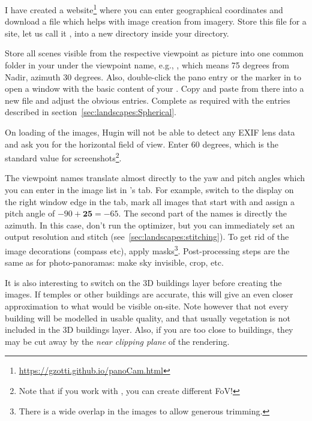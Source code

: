 I have created a
website\footnote{\url{https://gzotti.github.io/panoCam.html}} where
you can enter geographical coordinates and download a file
  which helps with image creation from 
imagery. Store this file for a site, let us call it
, into a new directory  inside
your  directory.

Store all scenes visible from the respective viewpoint
 as picture into one common folder in your
 under the viewpoint name, e.g.,
, which means 75 degrees from Nadir, azimuth 30
degrees.  Also, double-click the pano entry or the marker in  to open a window with the
basic content of your . Copy and paste from there
into a new file  and adjust the obvious
entries. Complete as required with the entries described in
section~\ref{sec:landscapes:Spherical}.

On loading of the images, Hugin will not be able to detect any EXIF
lens data and ask you for the horizontal field of view. Enter 60
degrees, which is the standard value for 
screenshots\footnote{Note that if you work with , you
  can create different FoV!}.

The viewpoint names translate almost directly to the yaw and pitch
angles which you can enter in the image list in 's
 tab. For example, switch to the  display
on the right window edge in the  tab, mark all images that
start with  and assign a pitch angle of
$-90+\mathbf{25}=-65$. The second part of the names is directly the
azimuth.  In this case, don't run the optimizer, but you can
immediately set an output resolution and stitch
(see~\ref{sec:landscapes:stitching}). To get rid of the image
decorations (compass etc), apply masks\footnote{There is a wide
  overlap in the images to allow generous trimming.}. Post-processing
steps are the same as for photo-panoramas: make sky invisible, crop,
etc.

It is also interesting to switch on the 3D buildings layer before
creating the images. If temples or other buildings are accurate, this
will give an even closer approximation to what would be visible
on-site. Note however that not every building will be modelled in
usable quality, and that usually vegetation is not included in the 3D
buildings layer. Also, if you are too close to buildings, they may be
cut away by the \emph{near clipping plane} of the rendering.

